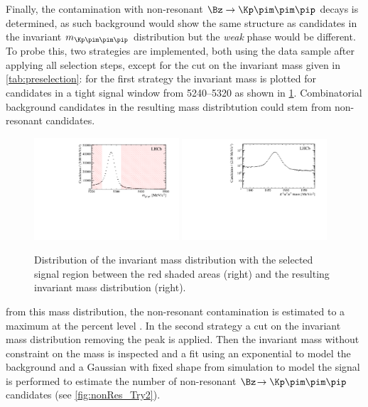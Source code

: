 Finally, the contamination with non-resonant $\Bz\to\Kp\pim\pim\pip$ decays is determined, as such background would show the same structure as \BdToDpi candidates in the invariant $m_{\Kp\pim\pim\pip}$ distribution but the \emph{weak} phase would be different.
To probe this, two strategies are implemented, both using the data sample after applying all selection steps, except for the cut on the invariant \mbox{\Dm mass} given in \cref{tab:preselection}:
for the first strategy the invariant \Dm mass is plotted for candidates in a tight \Bz signal window from \SIrange[per-mode=symbol]{5240}{5320}{\MeVcc} as shown in \cref{fig:nonRes_Try1}.
Combinatorial background candidates in the resulting \Dm mass distribtution could stem from non-resonant \Kpm\pimp\pimp\pipm candidates.
\begin{figure}[tb]
    \centering
    \includegraphics[width=0.48\textwidth]{07selection/figs/BmassCut.pdf}
    \includegraphics[width=0.48\textwidth]{07selection/figs/Resulting_Dmass.pdf}
    \caption{Distribution of the invariant \Bz mass distribution with the selected signal region between the red shaded areas (right) and the resulting invariant \Dm mass distribution (right).}
    \label{fig:nonRes_Try1}
\end{figure}
from this \Dm mass distribution, the non-resonant contamination is estimated to a maximum at the percent level .
In the second strategy a cut on the invariant \Dm mass distribution removing the \Dm peak is applied.
Then the invariant \Bz mass without constraint on the \Dm mass is inspected and a fit using an exponential to model the background and a Gaussian with fixed shape from simulation to model the signal is performed to estimate the number of non-resonant $\Bz\!\to\Kp\pim\pim\pip$ candidates (see \cref{fig:nonRes_Try2}).
